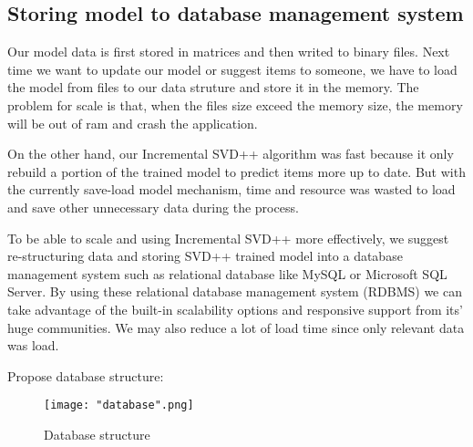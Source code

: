 \documentclass[oneside,13pt]{extreport}
\begin{document}
\subsection{Storing model to database management system}

Our model data is first stored in matrices and then writed to binary files. Next time we want to update our model or suggest items to someone, we have to load the model from files to our data struture and store it in the memory. The problem for scale is that, when the files size exceed the memory size, the memory will be out of ram and crash the application.

On the other hand, our Incremental SVD++ algorithm was fast because it only rebuild a portion of the trained model to predict items more up to date. But with the currently save-load model mechanism, time and resource was wasted to load and save other unnecessary data during the process.

To be able to scale and using Incremental SVD++ more effectively, we suggest re-structuring data and storing SVD++ trained model into a database management system such as relational database like MySQL or Microsoft SQL Server. By using these relational database management system (RDBMS) we can take advantage of the built-in scalability options and responsive support from its' huge communities. We may also reduce a lot of load time since only relevant data was load.

Propose database structure: 

\begin{figure}[h!]
    \centering
    \texttt{[image: "database".png]} 
    \caption{Database structure}
    \label{fig:database}
\end{figure}



\vfill
{}




\nocite{*}





\printindex
\end{document}
